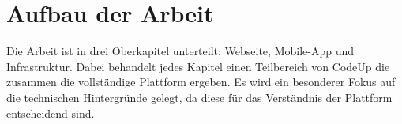 \documentclass[main.tex]{subfiles}
\begin{document}
\section{Aufbau der Arbeit}
Die Arbeit ist in drei Oberkapitel unterteilt: Webseite, Mobile-App und Infrastruktur.
Dabei behandelt jedes Kapitel einen Teilbereich von CodeUp die zusammen die vollständige Plattform ergeben.
Es wird ein besonderer Fokus auf die technischen Hintergründe gelegt, da diese für das Verständnis der Plattform entscheidend sind.
\end{document}
